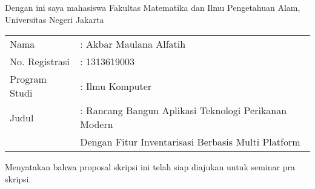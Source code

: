 \chapter*{}
\thispagestyle{empty} {\bf }Dengan ini saya mahasiswa Fakultas
Matematika dan Ilmu Pengetahuan Alam, Universitas Negeri Jakarta

\vskip3mm

\begin{tabular}{ll}
  Nama & : Akbar Maulana Alfatih \\
  No. Registrasi & : 1313619003\\
  Program Studi & : Ilmu Komputer \\
  Judul & : Rancang Bangun Aplikasi Teknologi Perikanan Modern \\ & \hspace{0.2cm}  Dengan Fitur Inventarisasi Berbasis Multi Platform \\
\end{tabular}

\vskip3mm

\noindent \hskip10mm Menyatakan bahwa proposal skripsi ini telah siap diajukan untuk seminar pra skripsi.




